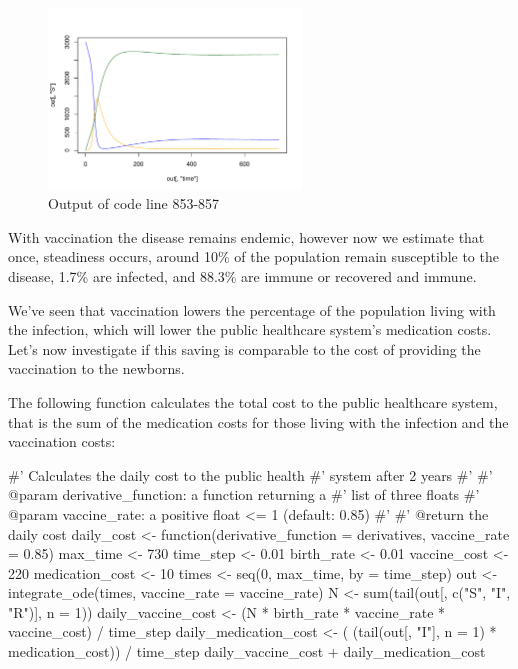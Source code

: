 \begin{figure}
\begin{center}
\includegraphics[width=0.6\textwidth]{./assets/plot_with_vaccine_R.pdf}
\end{center}
\caption{Output of code line 853-857}
\label{fig:plot_with_vaccine_R}
\end{figure}

With vaccination the disease remains endemic, however now we estimate that once,
steadiness occurs, around 10\% of the population remain susceptible to the
disease, 1.7\% are infected, and 88.3\% are immune or recovered and immune.

We've seen that vaccination lowers the percentage of the population living with
the infection, which will lower the public healthcare system's medication costs.
Let's now investigate if this saving is comparable to the cost of providing the
vaccination to the newborns.

The following function calculates the total cost to the public healthcare
system, that is the sum of the medication costs for those living with the
infection and the vaccination costs:

\begin{Rin}
#' Calculates the daily cost to the public health
#' system after 2 years
#'
#' @param derivative_function: a function returning a
#'                             list of three floats
#' @param vaccine_rate: a positive float <= 1 (default: 0.85)
#'
#' @return the daily cost
daily_cost <- function(derivative_function = derivatives,
                       vaccine_rate = 0.85){
  max_time <- 730
  time_step <- 0.01
  birth_rate <- 0.01
  vaccine_cost <- 220
  medication_cost <- 10
  times <- seq(0, max_time, by = time_step)
  out <- integrate_ode(times, vaccine_rate = vaccine_rate)
  N <- sum(tail(out[, c("S", "I", "R")], n = 1))
  daily_vaccine_cost <- (N
                         * birth_rate
                         * vaccine_rate
                         * vaccine_cost) / time_step
  daily_medication_cost <- ( (tail(out[, "I"], n = 1)
                             * medication_cost)) / time_step
  daily_vaccine_cost + daily_medication_cost
}
\end{Rin}

